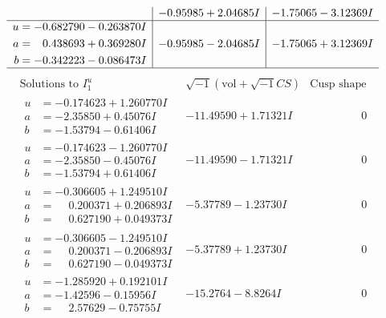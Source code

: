\documentclass[1p]{elsarticle_modified}
\theoremstyle{definition}
\newcommand{\I}{\sqrt{-1}}
\begin{document}
$$\begin{array}{c|c|c}
 & -0.95985 + 2.04685 I & -1.75065 - 3.12369 I \\ \hline\begin{aligned}
u &= -0.682790 - 0.263870 I \\
a &= \phantom{-}0.438693 + 0.369280 I \\
b &= -0.342223 - 0.086473 I\end{aligned}
 & -0.95985 - 2.04685 I & -1.75065 + 3.12369 I\\
 \hline 
 \end{array}$$\newpage$$\begin{array}{c|c|c}  
\text{Solutions to }I^u_{1}& \I (\text{vol} + \sqrt{-1}CS) & \text{Cusp shape}\\
 \hline 
\begin{aligned}
u &= -0.174623 + 1.260770 I \\
a &= -2.35850 + 0.45076 I \\
b &= -1.53794 - 0.61406 I\end{aligned}
 & -11.49590 + 1.71321 I & \phantom{-0.000000 } 0 \\ \hline\begin{aligned}
u &= -0.174623 - 1.260770 I \\
a &= -2.35850 - 0.45076 I \\
b &= -1.53794 + 0.61406 I\end{aligned}
 & -11.49590 - 1.71321 I & \phantom{-0.000000 } 0 \\ \hline\begin{aligned}
u &= -0.306605 + 1.249510 I \\
a &= \phantom{-}0.200371 + 0.206893 I \\
b &= \phantom{-}0.627190 + 0.049373 I\end{aligned}
 & -5.37789 - 1.23730 I & \phantom{-0.000000 } 0 \\ \hline\begin{aligned}
u &= -0.306605 - 1.249510 I \\
a &= \phantom{-}0.200371 - 0.206893 I \\
b &= \phantom{-}0.627190 - 0.049373 I\end{aligned}
 & -5.37789 + 1.23730 I & \phantom{-0.000000 } 0 \\ \hline\begin{aligned}
u &= -1.285920 + 0.192101 I \\
a &= -1.42596 - 0.15956 I \\
b &= \phantom{-}2.57629 - 0.75755 I\end{aligned}
 & -15.2764 - 8.8264 I & \phantom{-0.000000 } 0 \\ \hline\begin{aligned}

\end{aligned}
\end{array}$$
\end{document}

